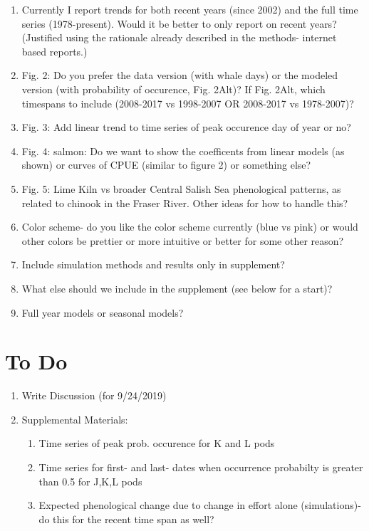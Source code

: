 \documentclass{article}
\begin{document}
\begin{enumerate}
\item Currently I report trends for both recent years (since 2002) and the full time series (1978-present). Would it be better to only report on recent years? (Justified using the rationale already described in the methods- internet based reports.)
\item Fig. 2: Do you prefer the data version (with whale days) or the modeled version (with probability of occurence, Fig. 2Alt)? If Fig. 2Alt, which timespans to include (2008-2017 vs 1998-2007 OR 2008-2017 vs 1978-2007)?
\item Fig. 3: Add linear trend to time series of peak occurence day of year or no?
\item Fig. 4: salmon: Do we want to show the coefficents from linear models (as shown) or curves of CPUE (similar to figure 2) or something else?
\item Fig. 5: Lime Kiln vs broader Central Salish Sea phenological patterns, as related to chinook in the Fraser River. Other ideas for how to handle this?
\item Color scheme- do you like the color scheme currently (blue vs pink) or would other colors be prettier or more intuitive or better for some other reason?
\item Include simulation methods and results only in supplement?
\item What else should we include in the supplement (see below for a start)?
\item Full year models or seasonal models?

\end{enumerate}
\section*{To Do}
\begin{enumerate}
\item Write Discussion (for 9/24/2019)
\item Supplemental Materials:
\begin{enumerate}
\item Time series of peak prob. occurence for K and L pods
\item Time series for first- and last- dates when occurrence probabilty is greater than 0.5 for J,K,L pods
\item Expected phenological change due to change in effort alone (simulations)- do this for the recent time span as well?

\end{enumerate}
\end{enumerate}

\end{document}
